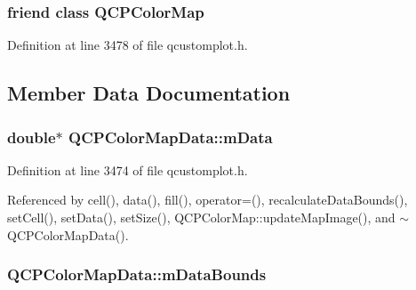 \subsubsection[{Q\+C\+P\+Color\+Map}]{\setlength{\rightskip}{0pt plus 5cm}friend class {\bf Q\+C\+P\+Color\+Map}\hspace{0.3cm}{\ttfamily [friend]}}\label{class_q_c_p_color_map_data_afa9d9eab63af3e6f20f882c8d7cc9f20}


Definition at line 3478 of file qcustomplot.\+h.



\subsection{Member Data Documentation}
\hypertarget{class_q_c_p_color_map_data_ac1682862022f575191351c9825187d39}{}
\subsubsection[{m\+Data}]{\setlength{\rightskip}{0pt plus 5cm}double$\ast$ Q\+C\+P\+Color\+Map\+Data\+::m\+Data\hspace{0.3cm}{\ttfamily [protected]}}\label{class_q_c_p_color_map_data_ac1682862022f575191351c9825187d39}


Definition at line 3474 of file qcustomplot.\+h.



Referenced by cell(), data(), fill(), operator=(), recalculate\+Data\+Bounds(), set\+Cell(), set\+Data(), set\+Size(), Q\+C\+P\+Color\+Map\+::update\+Map\+Image(), and $\sim$\+Q\+C\+P\+Color\+Map\+Data().

\hypertarget{class_q_c_p_color_map_data_a1798b3dcc0a27091d196bfd156dcb3f2}{}
\subsubsection[{m\+Data\+Bounds}]{ Q\+C\+P\+Color\+Map\+Data\+::m\+Data\+Bounds\hspace{0.3cm}{\ttfamily [protected]}}\label{class_q_c_p_color_map_data_a1798b3dcc0a27091d196bfd156dcb3f2}


